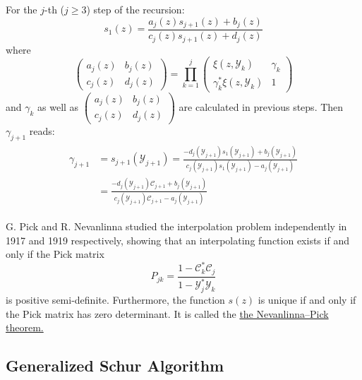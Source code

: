 \documentclass[
	preprint,%
	aps,
	prb,
	showpacs,	
	amsmath, amssymb]{revtex4-2}
\newcommand{\Y}{ {\mathcal{Y}} }
\newcommand{\C}{ {\mathcal{C}} }
\begin{document}
For the $j$-th ($j \geq 3$) step of the recursion:
\begin{equation}
	s_1(z) 
	= \frac{a_j(z) s_{j+1}(z) + b_j(z)}{c_j(z) s_{j+1}(z) + d_j(z)}
\end{equation}
where
\begin{equation}
	\left(
		\begin{matrix}
			a_j(z) & b_j(z) \\
			c_j(z) & d_j(z)
		\end{matrix}
	\right)
	= \prod_{k=1}^{j}
	\left(
		\begin{matrix}
			\xi(z, \Y_k)            & \gamma_k \\
			\gamma_k^* \xi(z, \Y_k) & 1
		\end{matrix}
	\right)
\end{equation}
and $\gamma_k$ as well as $	\left(
	\begin{matrix}
		a_j(z) & b_j(z) \\
		c_j(z) & d_j(z)
	\end{matrix}
\right)$ are calculated in previous steps. 
Then $\gamma_{j+1}$ reads:
\begin{align}
\begin{split}
	\gamma_{j+1} &= s_{j+1}(\Y_{j+1}) 
	= \frac{-d_j(\Y_{j+1}) s_1(\Y_{j+1}) + b_j(\Y_{j+1})} 
		{c_j(\Y_{j+1}) s_1(\Y_{j+1}) - a_j(\Y_{j+1})}\\
	&= \frac{-d_j(\Y_{j+1}) \C_{j+1} + b_j(\Y_{j+1})}
		{c_j(\Y_{j+1}) \C_{j+1} - a_j(\Y_{j+1})}
\end{split}
\end{align}


G. Pick and R. Nevanlinna studied the interpolation problem 
independently in 1917\cite{Pick1917} and 1919\cite{nevanlinna1919uber} 
respectively, showing that an 
interpolating function exists if and only if the Pick matrix
\begin{equation}\label{eq:pick-matrix-origional}
	P_{jk} = \frac{1-\C_k^* \C_j}{1 - \Y_j^* \Y_k}
\end{equation}
is positive semi-definite. Furthermore, the function $s(z)$ is 
unique if and only if the Pick matrix has zero determinant. It 
is called the 
\href{https://en.wikipedia.org/wiki/Nevanlinna%E2%80%93Pick_interpolation}
	{the Nevanlinna–Pick theorem.}


\subsection{Generalized Schur Algorithm}
\label{subsec:generalized-schur-algorithm}
\end{document}
